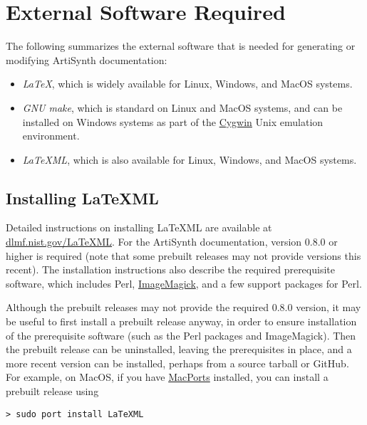 \documentclass{article}
\begin{document}
\section{External Software Required}
\label{ExternalSoftwareSec}

The following summarizes the external software that
is needed for generating or modifying ArtiSynth
documentation:

\begin{itemize}

\item {\it LaTeX}, which is widely available for Linux, Windows,
and MacOS systems.

\item {\it GNU make}, which is standard on Linux and MacOS systems,
and can be installed on Windows systems as part of the 
\href{http://www.cygwin.com}{Cygwin} Unix emulation environment.

\item {\it LaTeXML}, which is also available for Linux, Windows, and
MacOS systems.  

\end{itemize}

\subsection{Installing LaTeXML}

Detailed instructions on installing LaTeXML are available at
\href{http://dlmf.nist.gov/LaTeXML/}{dlmf.nist.gov/LaTeXML}.  For the
ArtiSynth documentation, version 0.8.0 or higher is required (note
that some prebuilt releases may not provide versions this recent).
The installation instructions also describe the required prerequisite
software, which includes Perl,
\href{http://www.imagemagick.org}{ImageMagick}, and a few support
packages for Perl.

Although the prebuilt releases may not provide the required 0.8.0
version, it may be useful to first install a prebuilt release anyway,
in order to ensure installation of the prerequisite software (such as
the Perl packages and ImageMagick). Then the prebuilt release can be
uninstalled, leaving the prerequisites in place, and a more recent
version can be installed, perhaps from a source tarball or GitHub. For
example, on MacOS, if you have
\href{http://www.macports.org}{MacPorts} installed, you can install a
prebuilt release using

\begin{lstlisting}[]
  > sudo port install LaTeXML
\end{lstlisting}
\end{document}
